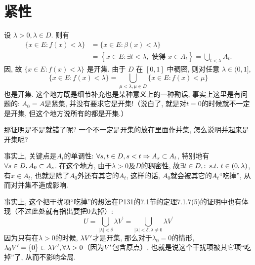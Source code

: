     \section{紧性}
    \begin{detail}{16}{设 $\lambda>0, \lambda \in D$. 则有
        \[
        \begin{aligned}
        \{x \in E: f(x)<\lambda\} &=\{x \in E: \beta(x)<\lambda\} \\
        &=\left\{x \in E: \exists t<\lambda, \text { 使得 } x \in A_{t}\right\}=\bigcup_{t<\lambda} A_{t} .
        \end{aligned}
        \]
        因, 故 $\{x \in E: f(x)<\lambda\}$ 是开集. 由于 $D$ 在 $[0,1]$ 中稠密, 则对任意 $\lambda \in(0,1]$,
        \[
        \{x \in E: f(x)<\lambda\}=\bigcup_{\mu<\lambda, \mu \in D}\{x \in E: f(x)<\mu\}
        \]也是开集.}
        这个地方既是细节补充也是某种意义上的一种勘误, 事实上这里是有问题的: $A_0=A$是紧集, 并没有要求它是开集!（说白了, 就是对$t=0$的时候就不一定是开集, 但这个地方说所有的都是开集.）

        那证明是不是就错了呢? 一个不一定是开集的放在里面作并集, 怎么说明并起来是开集呢? 

        事实上, 关键点是$A_t$的单调性: $\forall s,t\in D , s<t \Rightarrow A_s \subset A_t$, 特别地有$\forall s\in D, A_0\subset A_s$. 在这个地方, 由于$\lambda>0$及$D$的稠密性, 故$\exists t \in D, \st t\in (0,\lambda)$, 有$x\in A_t$, 也就是除了$A_0$外还有其它的$A_t$, 这样的话, $A_0$就会被其它的$A_t$“吃掉”, 从而对并集不造成影响.
        \begin{remark}
            事实上, 这个把干扰项“吃掉”的想法在P131的7.1节的定理7.1.7(5)的证明中也有体现（不过此处就有指出要把0去掉）:
            \[U=\bigcup_{|\lambda|<\delta} \lambda V^{\prime}=\bigcup_{|\lambda|<\delta, \lambda \neq 0} \lambda V^{\prime}\]
            因为只有在$\lambda >0$的时候, $\lambda V^{\prime}$才是开集, 那么对于$\lambda_0=0$的情形, $\lambda_0V^{\prime} = \{0\} \subset \lambda V^{\prime}, \forall \lambda >0$（因为$V^{\prime}$包含原点）, 也就是说这个干扰项被其它项“吃掉”了, 从而不影响全局.
        \end{remark}
    \end{detail}